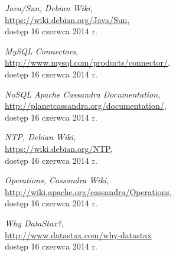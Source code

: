 \documentclass{article} %
\begin{document}
\begin{thebibliography}{10}
\emph{Java/Sun, Debian Wiki},\\
\url{https://wiki.debian.org/Java/Sun},\\
dostęp 16 czerwca 2014 r.

\emph{MySQL Connectors},\\
\url{http://www.mysql.com/products/connector/},\\
dostęp 16 czerwca 2014 r.

\emph{NoSQL Apache Cassandra Documentation},\\
\url{http://planetcassandra.org/documentation/},\\
dostęp 16 czerwca 2014 r.

\emph{NTP, Debian Wiki},\\
\url{https://wiki.debian.org/NTP},\\
dostęp 16 czerwca 2014 r.

\emph{Operations, Cassandra Wiki},\\
\url{http://wiki.apache.org/cassandra/Operations},\\
dostęp 16 czerwca 2014 r.

\emph{Why DataStax?},\\
\url{http://www.datastax.com/why-datastax}\\
dostęp 16 czerwca 2014 r.

\end{thebibliography}
\end{document}
